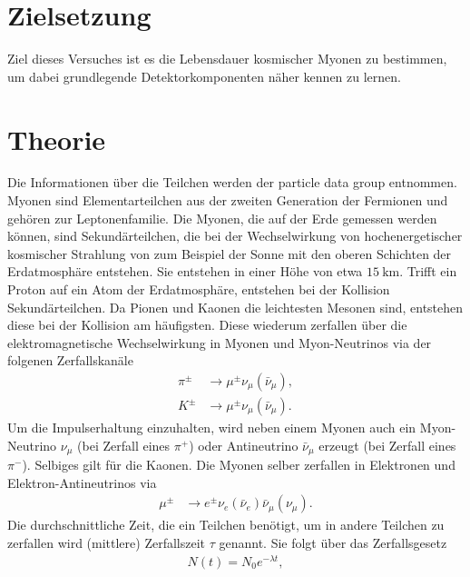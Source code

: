 \section{Zielsetzung}\label{sec:Zielsetzung}

Ziel dieses Versuches ist es die Lebensdauer kosmischer Myonen zu bestimmen, um dabei grundlegende Detektorkomponenten näher kennen zu lernen.

\section{Theorie}\label{sec:Theorie}

Die Informationen über die Teilchen werden der particle data group entnommen\cite{ParticleDataGroup:2024cfk}. \newline
Myonen sind Elementarteilchen aus der zweiten Generation der Fermionen und gehören zur Leptonenfamilie.
Die Myonen, die auf der Erde gemessen werden können, sind Sekundärteilchen, die bei der Wechselwirkung von hochenergetischer kosmischer Strahlung von zum Beispiel der Sonne mit den oberen Schichten der Erdatmosphäre entstehen.
Sie entstehen in einer Höhe von etwa $\SI{15}{\kilo\meter}$.
Trifft ein Proton auf ein Atom der Erdatmosphäre, entstehen bei der Kollision Sekundärteilchen.
Da Pionen und Kaonen die leichtesten Mesonen sind, entstehen diese bei der Kollision am häufigsten.
Diese wiederum zerfallen über die elektromagnetische Wechselwirkung in Myonen und Myon-Neutrinos via der folgenen Zerfallskanäle
\begin{align*}
    \pi^\pm&\rightarrow \mu^\pm\nu_\mu(\bar\nu_\mu),\\
    K^\pm&\rightarrow\mu^\pm\nu_\mu(\bar\nu_\mu).
\end{align*}
Um die Impulserhaltung einzuhalten, wird neben einem Myonen auch ein Myon-Neutrino $\nu_\mu$ (bei Zerfall eines $\pi^+$) oder Antineutrino $\bar\nu_\mu$ erzeugt (bei Zerfall eines $\pi^-$).
Selbiges gilt für die Kaonen. 
Die Myonen selber zerfallen in Elektronen und Elektron-Antineutrinos via
\begin{align*}
    \mu^\pm &\rightarrow e^\pm \nu_e(\bar\nu_e) \bar\nu_\mu (\nu_\mu).
\end{align*}
\newline
Die durchschnittliche Zeit, die ein Teilchen benötigt, um in andere Teilchen zu zerfallen wird (mittlere) Zerfallszeit $\tau$ genannt.
Sie folgt über das Zerfallsgesetz 
\begin{align}
    N(t)=N_0e^{-\lambda t},
\end{align}
